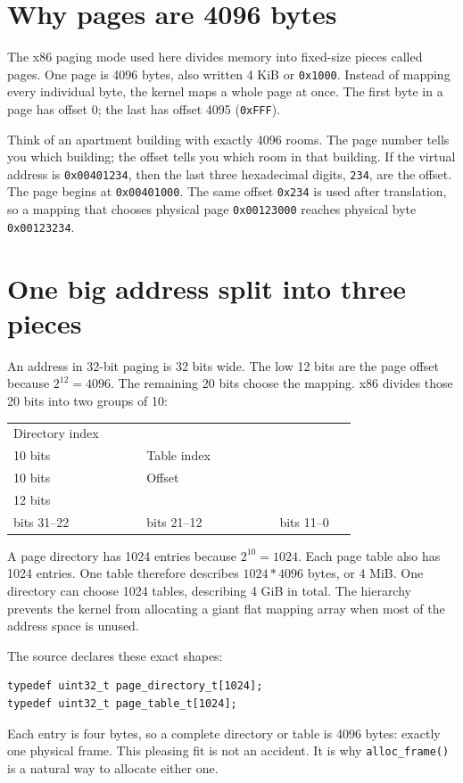\section{Why pages are 4096 bytes}
The x86 paging mode used here divides memory into fixed-size pieces called pages. One page is 4096 bytes, also written 4 KiB or \texttt{0x1000}. Instead of mapping every individual byte, the kernel maps a whole page at once. The first byte in a page has offset 0; the last has offset 4095 (\texttt{0xFFF}).

Think of an apartment building with exactly 4096 rooms. The page number tells you which building; the offset tells you which room in that building. If the virtual address is \texttt{0x00401234}, then the last three hexadecimal digits, \texttt{234}, are the offset. The page begins at \texttt{0x00401000}. The same offset \texttt{0x234} is used after translation, so a mapping that chooses physical page \texttt{0x00123000} reaches physical byte \texttt{0x00123234}.

\section{One big address split into three pieces}
An address in 32-bit paging is 32 bits wide. The low 12 bits are the page offset because \(2^{12} = 4096\). The remaining 20 bits choose the mapping. x86 divides those 20 bits into two groups of 10:
\begin{center}
\begin{tabular}{|p{0.31\linewidth}|p{0.31\linewidth}|p{0.18\linewidth}|}
\hline
\centering Directory index\\10 bits & \centering Table index\\10 bits & \centering Offset\\12 bits\tabularnewline
\hline
bits 31--22 & bits 21--12 & bits 11--0\\
\hline
\end{tabular}
\end{center}

A page directory has 1024 entries because \(2^{10}=1024\). Each page table also has 1024 entries. One table therefore describes \(1024 * 4096\) bytes, or 4 MiB. One directory can choose 1024 tables, describing 4 GiB in total. The hierarchy prevents the kernel from allocating a giant flat mapping array when most of the address space is unused.

The source declares these exact shapes:
\begin{verbatim}
typedef uint32_t page_directory_t[1024];
typedef uint32_t page_table_t[1024];
\end{verbatim}
Each entry is four bytes, so a complete directory or table is 4096 bytes: exactly one physical frame. This pleasing fit is not an accident. It is why \texttt{alloc\_frame()} is a natural way to allocate either one.


